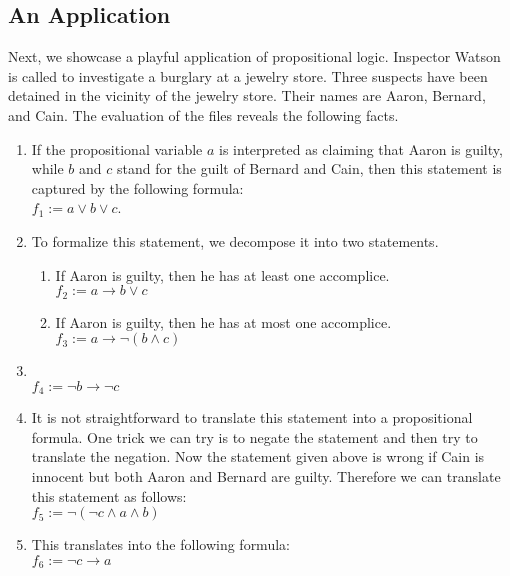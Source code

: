 \subsection{An Application}
Next, we showcase a playful application of propositional logic.  Inspector Watson is called to investigate a
burglary at a jewelry store.  Three suspects have been detained in the vicinity of the jewelry store.
Their names are Aaron, Bernard, and Cain.  The evaluation of the files reveals the following facts.
\begin{enumerate}
\item {}

      If the propositional variable $a$ is interpreted as claiming that Aaron is guilty, while $b$ and $c$
      stand for the guilt of Bernard and Cain, then this statement is captured by the following formula: 
      \\[0.2cm]
      \hspace*{1.3cm} 
      $f_1 := a \vee b \vee c$.
\item {}
      
      To formalize this statement, we decompose it into two statements.
      \begin{enumerate}
      \item If Aaron is guilty, then he has at least one accomplice. \\[0.2cm]
            \hspace*{1.3cm} $f_2 := a \rightarrow b \vee c$ 
      \item If Aaron is guilty, then he has at most one accomplice. \\[0.2cm]
           \hspace*{1.3cm} $f_3 := a \rightarrow \neg (b \wedge c)$
      \end{enumerate}
\item {} \\[0.2cm]
      \hspace*{1.3cm} $f_4 :=  \neg b \rightarrow \neg c$ 
\item {}

      It is not straightforward to translate this statement into a propositional formula.
      One trick we can try is to negate the statement and then try to translate the negation.
      Now the statement given above is wrong if Cain is innocent but both Aaron and Bernard are guilty.
      Therefore we can translate this statement as follows: \\[0.2cm]
      \hspace*{1.3cm} $f_5 := \neg ( \neg c  \wedge a \wedge b )$ 
\item {} 

      This translates into the following formula:\\[0.2cm]
      \hspace*{1.3cm} $f_6 := \neg c \rightarrow a$
\end{enumerate}
